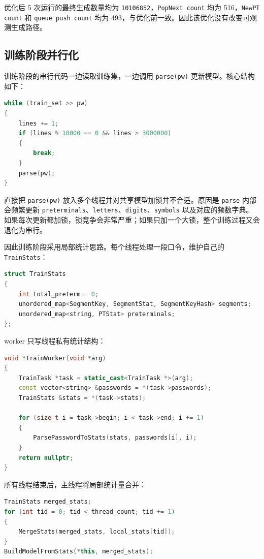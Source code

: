 \documentclass[UTF8,a4paper,12pt]{ctexart}
\begin{document}
优化后 5 次运行的最终生成数量均为 \texttt{10106852}，\texttt{PopNext count} 均为 516，\texttt{NewPT count} 和 \texttt{queue push count} 均为 493，与优化前一致。因此该优化没有改变可观测生成路径。

\subsection{训练阶段并行化}

训练阶段的串行代码一边读取训练集，一边调用 \texttt{parse(pw)} 更新模型。核心结构如下：

\begin{lstlisting}[language=C++]
while (train_set >> pw)
{
    lines += 1;
    if (lines % 10000 == 0 && lines > 3000000)
    {
        break;
    }
    parse(pw);
}
\end{lstlisting}

直接把 \texttt{parse(pw)} 放入多个线程并对共享模型加锁并不合适。原因是 \texttt{parse} 内部会频繁更新 \texttt{preterminals}、\texttt{letters}、\texttt{digits}、\texttt{symbols} 以及对应的频数字典。如果每次更新都加锁，锁竞争会非常严重；如果只加一个大锁，整个训练过程又会退化为串行。

因此训练阶段采用局部统计思路。每个线程处理一段口令，维护自己的 \texttt{TrainStats}：

\begin{lstlisting}[language=C++]
struct TrainStats
{
    int total_preterm = 0;
    unordered_map<SegmentKey, SegmentStat, SegmentKeyHash> segments;
    unordered_map<string, PTStat> preterminals;
};
\end{lstlisting}

worker 只写线程私有统计结构：

\begin{lstlisting}[language=C++]
void *TrainWorker(void *arg)
{
    TrainTask *task = static_cast<TrainTask *>(arg);
    const vector<string> &passwords = *(task->passwords);
    TrainStats &stats = *(task->stats);

    for (size_t i = task->begin; i < task->end; i += 1)
    {
        ParsePasswordToStats(stats, passwords[i], i);
    }
    return nullptr;
}
\end{lstlisting}

所有线程结束后，主线程将局部统计量合并：

\begin{lstlisting}[language=C++]
TrainStats merged_stats;
for (int tid = 0; tid < thread_count; tid += 1)
{
    MergeStats(merged_stats, local_stats[tid]);
}
BuildModelFromStats(*this, merged_stats);
\end{lstlisting}
\end{document}
